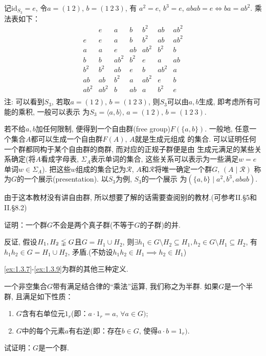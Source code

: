\begin{solution}
    记$\mathrm{id}_{S_3} = e$, 令$a = (1\:2)$, $b = (1\:2\:3)$, 有
$a^2 = e$, $b^3 = e$, $abab = e \iff ba = ab^2$. 乘法表如下：
\[
\begin{array}{c|cccccc}
  & e   & a   & b   & b^2 & ab  & ab^2 \\
\hline
e  & e   & a   & b   & b^2 & ab  & ab^2 \\
a  & a   & e   & ab  & ab^2 & b^2 & b \\
b  & b   & ab^2 & b^2 & e   & a   & ab \\
b^2 & b^2 & ab  & e   & b   & ab^2 & a \\
ab & ab  & b^2 & a   & ab^2 & e   & b \\
ab^2 & ab^2 & b   & ab  & a   & b^2 & e \\
\end{array}
\]
注: 可以看到$S_3$, 若取$a = (1\:2),\, b = (1\:2\:3)$,
则$S_3$可以由$a, b$生成, 即考虑所有可能的乘积, 一般可以表示
为$S_3 = \langle a, b \rangle,\, a = (1\:2),\, b = (1\:2\:3)$.

若不给$a, b$加任何限制, 便得到一个自由群(free group)$F(\{a, b\})$.
一般地, 任意一个集合$A$都可以生成一个自由群$F(A)$, $A$就是生成元组成
的集合. 可以证明任何一个群都同构于某个自由群的商群, 而对应的正规子群便是由
生成元满足的某些关系确定(将$A$看成字母表, $\Sigma_A$表示单词的集合,
这些关系可以表示为一些满足$w = e$单词$w \in \Sigma_A$).
把这些$w$组成的集合记为$\mathscr{R}$,
$A$和$\mathscr{R}$将唯一确定一个群$G$, $(A \mid \mathscr{R})$
称为$G$的一个展示(presentation). 以$S_3$为例, $S_3$的一个展示
为$(\{a, b\} \mid a^2, b^3, abab)$.

由于这本教材没有讲自由群, 所以想要了解的话需要查阅别的教材.(可参考\cite{aluffi2009algebra}II.\S5和II.\S8.2)
\end{solution}

\begin{problem}
    证明：一个群$G$不会是两个真子群(不等于$G$的子群)的并.
\end{problem}

\begin{solution}
    反证, 假设$H_1, H_2 \lvertneqq G$且$G = H_1 \cup H_2$,
则$\exists h_1 \in G \setminus H_2 \subseteq H_1, h_2 \in G \setminus H_1 \subseteq H_2$,
有$h_1h_2 \in G = H_1 \cup H_2$, 矛盾.(不妨设$h_1h_2 \in H_1 \implies h_2 \in H_1$)
\end{solution}

\ref{ex:1.3.7}-\ref{ex:1.3.9}为群的其他三种定义.

\begin{problem}\label{ex:1.3.7}
    一个非空集合$G$带有满足结合律的“乘法”运算, 我们称之为半群.
如果$G$是一个半群, 且满足如下性质：
\begin{enumerate}[(1)]
    \item $G$含有右单位元$1_r$(即：$a \cdot 1_r = a$, $\forall a \in G)$;
    \item $G$中的每个元素$a$有右逆(即：存在$b \in G$, 使得$a \cdot b = 1_r)$.
\end{enumerate}
试证明：$G$是一个群.
\end{problem}

